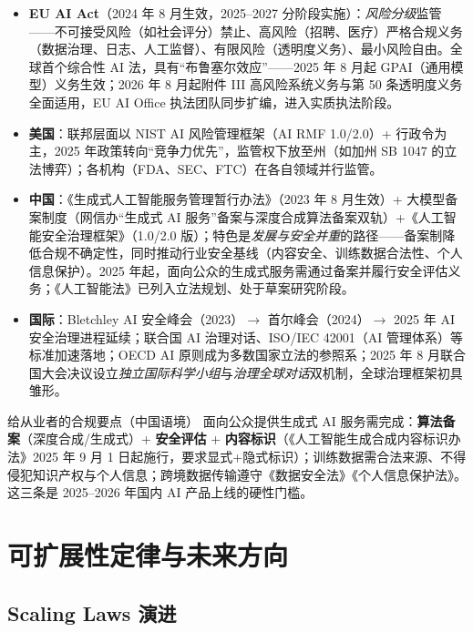 \documentclass[12pt,a4paper]{article}
\begin{document}
\begin{itemize}
  \item \textbf{EU AI Act}（2024 年 8 月生效，2025--2027 分阶段实施）：\emph{风险分级}监管——不可接受风险（如社会评分）禁止、高风险（招聘、医疗）严格合规义务（数据治理、日志、人工监督）、有限风险（透明度义务）、最小风险自由。全球首个综合性 AI 法，具有“布鲁塞尔效应”——2025 年 8 月起 GPAI（通用模型）义务生效；2026 年 8 月起附件 III 高风险系统义务与第 50 条透明度义务全面适用，EU AI Office 执法团队同步扩编，进入实质执法阶段。
  \item \textbf{美国}：联邦层面以 NIST AI 风险管理框架（AI RMF 1.0/2.0）+ 行政令为主，2025 年政策转向“竞争力优先”，监管权下放至州（如加州 SB 1047 的立法博弈）；各机构（FDA、SEC、FTC）在各自领域并行监管。
  \item \textbf{中国}：《生成式人工智能服务管理暂行办法》（2023 年 8 月生效）+ 大模型备案制度（网信办“生成式 AI 服务”备案与深度合成算法备案双轨）+《人工智能安全治理框架》（1.0/2.0 版）；特色是\emph{发展与安全并重}的路径——备案制降低合规不确定性，同时推动行业安全基线（内容安全、训练数据合法性、个人信息保护）。2025 年起，面向公众的生成式服务需通过备案并履行安全评估义务；《人工智能法》已列入立法规划、处于草案研究阶段。
  \item \textbf{国际}：Bletchley AI 安全峰会（2023）$\to$ 首尔峰会（2024）$\to$ 2025 年 AI 安全治理进程延续；联合国 AI 治理对话、ISO/IEC 42001（AI 管理体系）等标准加速落地；OECD AI 原则成为多数国家立法的参照系；2025 年 8 月联合国大会决议设立\emph{独立国际科学小组}与\emph{治理全球对话}双机制，全球治理框架初具雏形。
\end{itemize}

\begin{keybox}{给从业者的合规要点（中国语境）}
面向公众提供生成式 AI 服务需完成：\textbf{算法备案}（深度合成/生成式）+ \textbf{安全评估} + \textbf{内容标识}（《人工智能生成合成内容标识办法》2025 年 9 月 1 日起施行，要求显式+隐式标识）；训练数据需合法来源、不得侵犯知识产权与个人信息；跨境数据传输遵守《数据安全法》《个人信息保护法》。这三条是 2025--2026 年国内 AI 产品上线的硬性门槛。
\end{keybox}

\section{可扩展性定律与未来方向}

\subsection{Scaling Laws 演进}
\end{document}
